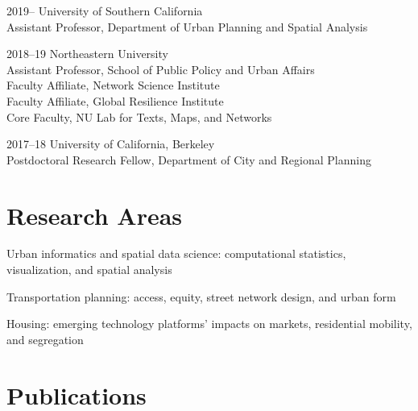 \documentclass[12pt,letterpaper]{report}
\newcommand{\listitemspace}{0.25em}
\renewenvironment{itemize}
{\begin{list}{}{\setlength{\leftmargin}{0em}
            \setlength{\parskip}{0em}
            \setlength{\itemsep}{\listitemspace}
            \setlength{\parsep}{\listitemspace}}}
{\end{list}}
\begin{document}
    \begin{tablist}

        \item[2019--]   \tab University of Southern California \\
                             Assistant Professor, Department of Urban Planning and Spatial Analysis

        \item[2018--19] \tab Northeastern University \\
                             Assistant Professor, School of Public Policy and Urban Affairs \\
                             Faculty Affiliate, Network Science Institute \\
                             Faculty Affiliate, Global Resilience Institute \\
                             Core Faculty, NU Lab for Texts, Maps, and Networks

        \item[2017--18] \tab University of California, Berkeley \\
                             Postdoctoral Research Fellow, Department of City and Regional Planning

    \end{tablist}



    \section*{Research Areas}

    \begin{itemize}

        \item Urban informatics and spatial data science: computational statistics, visualization, and spatial analysis

        \item Transportation planning: access, equity, street network design, and urban form

        \item Housing: emerging technology platforms' impacts on markets, residential mobility, and segregation

    \end{itemize}



    \section*{Publications}
\end{document}
